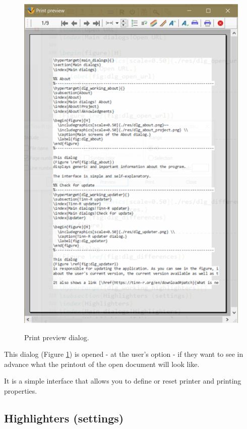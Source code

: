 \begin{figure}[H]
  \includegraphics[scale=0.50]{./res/dlg_print_preview.png} \\
  \caption{Print preview dialog.}
  \label{fig:dlg_print_preview}
\end{figure}
This dialog
(Figure \ref{fig:dlg_print_preview})
is opened - at the user's option - if they want to see in advance what the printout of
the open document will look like.

It is a simple interface that allows you to define or reset printer and printing properties.


\hypertarget{dlg_working_highlighters}{}
\subsection{Highlighters (settings)}

